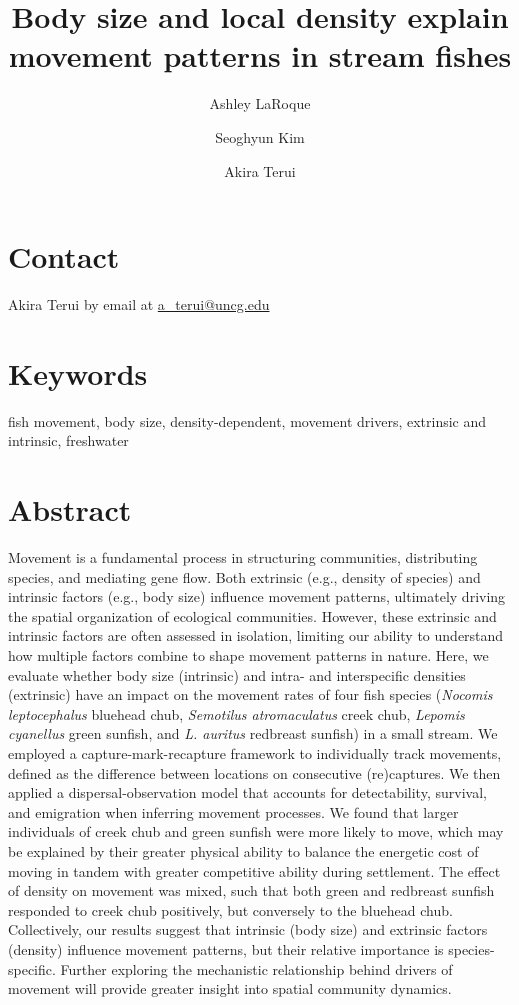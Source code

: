 \documentclass[11pt, class=article, crop=false]{standalone}
\date{} %
\title{Body size and local density explain movement patterns in stream fishes}
\date{} %
\author[1]{Ashley LaRoque}
\author[1, 2]{Seoghyun Kim}
\author[1]{Akira Terui}
\affil[1]{Depatment of Biology, University of North Carolina at Greensboro}
\affil[2]{Department of Biological Sciences, Kangwon National University}
\begin{document}
\maketitle
\thispagestyle{empty}

\section*{Contact}
Akira Terui by email at \url{a_terui@uncg.edu}

\newpage
\thispagestyle{empty}

\section*{Keywords}

fish movement, body size, density-dependent, movement drivers, extrinsic and intrinsic, freshwater

\section*{Abstract}

 Movement is a fundamental process in structuring communities, distributing species, and mediating gene flow. Both extrinsic (e.g., density of species) and intrinsic factors (e.g., body size) influence movement patterns, ultimately driving the spatial organization of ecological communities. However, these extrinsic and intrinsic factors are often assessed in isolation, limiting our ability to understand how multiple factors combine to shape movement patterns in nature. Here, we evaluate whether body size (intrinsic) and intra- and interspecific densities (extrinsic) have an impact on the movement rates of four fish species (\textit{Nocomis leptocephalus} bluehead chub, \textit{Semotilus atromaculatus} creek chub, \textit{Lepomis cyanellus} green sunfish, and \textit{L. auritus} redbreast sunfish) in a small stream. We employed a capture-mark-recapture framework to individually track movements, defined as the difference between locations on consecutive (re)captures. We then applied a dispersal-observation model that accounts for detectability, survival, and emigration when inferring movement processes. We found that larger individuals of creek chub and green sunfish were more likely to move, which may be explained by their greater physical ability to balance the energetic cost of moving in tandem with greater competitive ability during settlement. The effect of density on movement was mixed, such that both green and redbreast sunfish responded to creek chub positively, but conversely to the bluehead chub. Collectively, our results suggest that intrinsic (body size) and extrinsic factors (density) influence movement patterns, but their relative importance is species-specific. Further exploring the mechanistic relationship behind drivers of movement will provide greater insight into spatial community dynamics.
\end{document}
